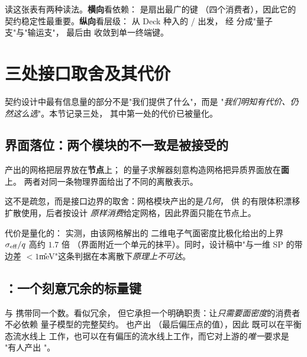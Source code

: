 \noindent
读这张表有两种读法。\textbf{横向}看依赖： 是扇出最广的键
（四个消费者），因此它的契约稳定性最重要。\textbf{纵向}看层级：
从 Deck 种入的 / 出发，
经  分成"量子支"与"输运支"，
最后由  收敛到单一终端键。

\section{三处接口取舍及其代价}
\label{sec:data-tradeoffs}

契约设计中最有信息量的部分不是"我们提供了什么"，而是
"\emph{我们明知有代价、仍然这么选}"。本节记录三处，
其中第一处的代价已被量化。

\subsection{界面落位：两个模块的不一致是被接受的}

 产出的网格把层界放在\textbf{节点}上；
 的量子求解器刻意构造网格把异质界面放在\textbf{面}上。
两者对同一条物理界面给出了不同的离散表示。

这不是疏忽，而是接口边界的取舍：网格模块产出的是\emph{几何}，
供  的有限体积漂移扩散使用，后者按设计
\emph{原样消费}给定网格，因此界面只能在节点上。

代价是量化的： 实测，由该网格解出的
二维电子气面密度比极化给出的上界 $\sigma_{\mathrm{eff}}/q$ 高约 $1.7$ 倍
（界面附近一个单元的抹平）。同时，设计稿中"与一维 SP 的带边差
$<1$\U{meV}"这条判据在本离散下\emph{原理上不可达}。


\subsection{：一个刻意冗余的标量键}

 与  携带同一个数。看似冗余，
但它承担一个明确职责：让\emph{只需要面密度}的消费者不必依赖
量子模型的完整契约。 也产出 
（最后偏压点的值），因此  既可以在平衡态流水线上
工作，也可以在有偏压的流水线上工作，而它对上游的\emph{唯一}要求是
"有人产出 "。


